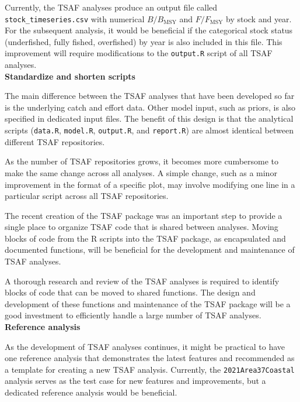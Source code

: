 \documentclass[12pt]{article}
\begin{document}
Currently, the TSAF analyses produce an output file called
\verb|stock_timeseries.csv| with numerical $B/B_\mathrm{MSY}$ and
$F/F_\mathrm{MSY}$ by stock and year. For the subsequent analysis, it would be
beneficial if the categorical stock status (underfished, fully fished,
overfished) by year is also included in this file. This improvement will require
modifications to the \verb|output.R| script of all TSAF analyses.\\[-2ex]

\textbf{Standardize and shorten scripts}

The main difference between the TSAF analyses that have been developed so far is
the underlying catch and effort data. Other model input, such as priors, is also
specified in dedicated input files. The benefit of this design is that the
analytical scripts (\verb|data.R|, \verb|model.R|, \verb|output.R|, and
\verb|report.R|) are almost identical between different TSAF repositories.

As the number of TSAF repositories grows, it becomes more cumbersome to make the
same change across all analyses. A simple change, such as a minor improvement in
the format of a specific plot, may involve modifying one line in a particular
script across all TSAF repositories.

The recent creation of the {\sf TSAF} package was an important step to provide a
single place to organize TSAF code that is shared between analyses. Moving
blocks of code from the R scripts into the {\sf TSAF} package, as encapsulated
and documented functions, will be beneficial for the development and maintenance
of TSAF analyses.

A thorough research and review of the TSAF analyses is required to identify
blocks of code that can be moved to shared functions. The design and development
of these functions and maintenance of the {\sf TSAF} package will be a good
investment to efficiently handle a large number of TSAF analyses.\\[-2ex]

\textbf{Reference analysis}

As the development of TSAF analyses continues, it might be practical to have one
reference analysis that demonstrates the latest features and recommended as a
template for creating a new TSAF analysis. Currently, the
\verb|2021Area37Coastal| analysis serves as the test case for new features and
improvements, but a dedicated reference analysis would be beneficial.\\[-2ex]
\end{document}
